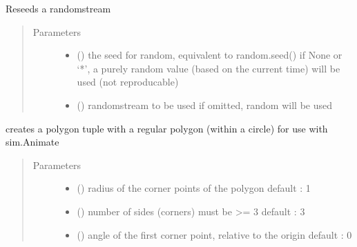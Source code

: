 \documentclass[letterpaper,10pt,english]{sphinxmanual}
\begin{document}

\begin{fulllineitems}
\label{\detokenize{Reference:salabim.random_seed}}
Reseeds a randomstream
\begin{quote}\begin{description}
\item[{Parameters}] \leavevmode\begin{itemize}
\item {} 
 (\sphinxstyleliteralemphasis{, }) \textendash{} the seed for random, equivalent to random.seed() 
if None or ‘*’, a purely random value (based on the current time) will be used
(not reproducable) 

\item {} 
 () \textendash{} randomstream to be used 
if omitted, random will be used 

\end{itemize}

\end{description}\end{quote}

\end{fulllineitems}


\begin{fulllineitems}
\label{\detokenize{Reference:salabim.regular_polygon}}
creates a polygon tuple with a regular polygon (within a circle) for use with sim.Animate
\begin{quote}\begin{description}
\item[{Parameters}] \leavevmode\begin{itemize}
\item {} 
 () \textendash{} radius of the corner points of the polygon 
default : 1

\item {} 
 () \textendash{} number of sides (corners) 
must be \textgreater{}= 3 
default : 3

\item {} 
 () \textendash{} angle of the first corner point, relative to the origin 
default : 0

\end{itemize}

\end{description}\end{quote}

\end{fulllineitems}
\end{document}
